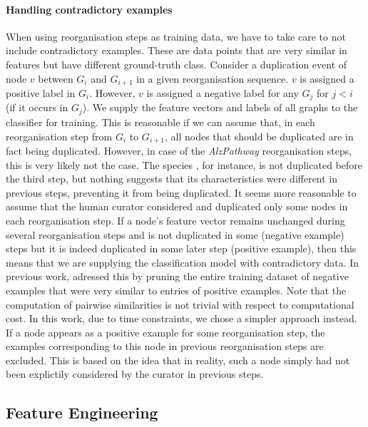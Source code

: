 \documentclass[
	fontsize=10pt, %
	twoside=false, %
	secnumdepth=1, %
  toc=indentunnumbered %
]{kaobook}
\begin{document}
\paragraph{Handling contradictory examples} When using reorganisation steps as
training data, we have to take care to not include contradictory examples. These
are data points that are very similar in features but have different
ground-truth class. Consider a duplication event of node $v$ between $G_i$ and
$G_{i+1}$ in a given reorganisation sequence. $v$ is assigned a positive label
in $G_i$. However, $v$ is assigned a negative label for any $G_j$ for $j<i$ (if
it occurs in $G_j$). We supply the feature vectors and labels of all graphs to
the classifier for training. This is reasonable if we can assume that, in each
reorganisation step from $G_i$ to $G_{i+1}$, all nodes that should be duplicated
are in fact being duplicated.
%
However, in case of the \textit{AlzPathway} reorganisation steps, this is very
likely not the case. The species , for instance, is not duplicated
before the third step, but nothing suggests that its characteristics were
different in previous steps, preventing it from being duplicated. It seems more
reasonable to assume that the human curator considered and duplicated only some
nodes in each reorganisation step.
%
If a node's feature vector remains unchanged during several reorganisation steps
and is not duplicated in some (negative example) steps but it is indeed
duplicated in some later step (positive example), then this means that we are
supplying the classification model with contradictory data. In previous work,
\nielsen{} adressed this by pruning the entire training dataset of negative
examples that were very similar to entries of positive examples. Note that the
computation of pairwise similarities is not trivial with respect to
computational cost. In this work, due to time constraints, we chose a simpler
approach instead. If a node appears as a positive example for some
reorganisation step, the examples corresponding to this node in previous
reorganisation steps are excluded. This is based on the idea that in reality,
such a node simply had not been explictily considered by the curator in previous
steps. 





\subsection{Feature Engineering}
\label{sec:feature-engineering}
\end{document}

